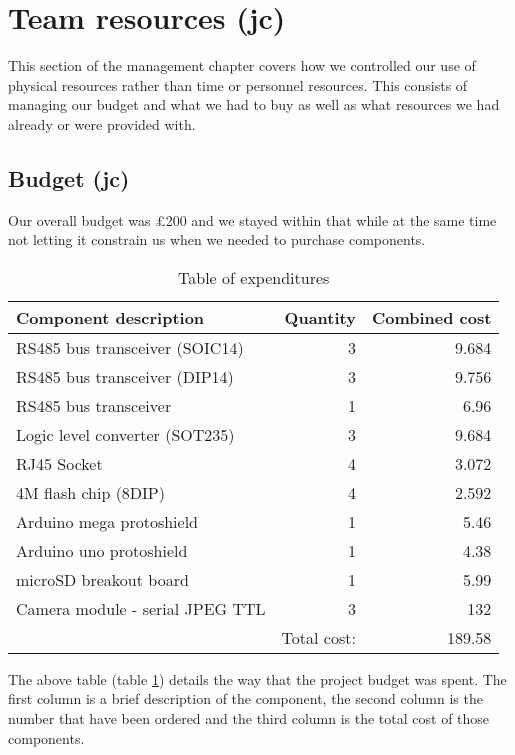 \section{Team resources (jc)}
\label{sec:team_resources}

This section of the management chapter covers how we controlled our use of physical resources rather than time or personnel resources. This consists of managing our budget and what we had to buy as well as what resources we had already or were provided with.

\subsection{Budget (jc)}

Our overall budget was \pounds 200 and we stayed within that while at the same time not letting it constrain us when we needed to purchase components.

\begin{table}[H]
\begin{tabular}{| l | r || r |}
\hline
\textbf{Component description} & \textbf{Quantity} & \textbf{Combined cost} \\ \hline \hline
RS485 bus transceiver (SOIC14) & 3 & 9.684 \\ \hline
RS485 bus transceiver (DIP14) & 3 & 9.756 \\ \hline
RS485 bus transceiver & 1 & 6.96 \\ \hline
Logic level converter (SOT235) & 3 & 9.684 \\ \hline
RJ45 Socket & 4 & 3.072 \\ \hline
4M flash chip (8DIP) & 4 & 2.592 \\ \hline
Arduino mega protoshield & 1 & 5.46 \\ \hline
Arduino uno protoshield & 1 & 4.38 \\ \hline
microSD breakout board & 1 & 5.99 \\ \hline
Camera module - serial JPEG TTL & 3 & 132 \\ \hline \hline
 & Total cost: & 189.58 \\ \hline
\end{tabular}
\caption{Table of expenditures}
\label{expenditure}
\end{table}

The above table (table \ref{expenditure}) details the way that the project budget was spent. The first column is a brief description of the component, the second column is the number that have been ordered and the third column is the total cost of those components.

